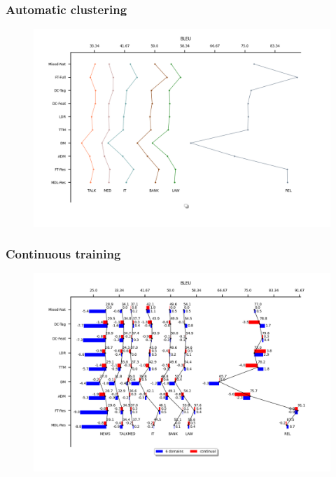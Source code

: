 \documentclass{beamer}
\begin{document}
\begin{frame}
\frametitle{Automatic clustering}
\begin{figure}
\includegraphics[width=\textwidth]{auto_cluster.png}
\end{figure}
\end{frame}

\begin{frame}
\frametitle{Continuous training}
\begin{figure}
\includegraphics[width=\textwidth]{continuous_training.png}
\end{figure}
\end{frame}

\end{document}
